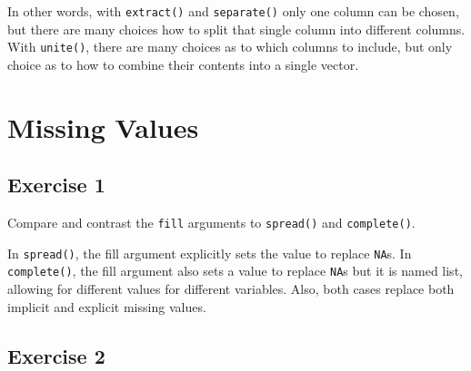 \documentclass[]{book}
\newenvironment{Shaded}{\begin{snugshade}}{\end{snugshade}}
\newcommand{\CommentTok}[1]{\textcolor[rgb]{0.56,0.35,0.01}{\textit{#1}}}
\newcommand{\DataTypeTok}[1]{\textcolor[rgb]{0.13,0.29,0.53}{#1}}
\newcommand{\DecValTok}[1]{\textcolor[rgb]{0.00,0.00,0.81}{#1}}
\newcommand{\KeywordTok}[1]{\textcolor[rgb]{0.13,0.29,0.53}{\textbf{#1}}}
\newcommand{\NormalTok}[1]{#1}
\newcommand{\OperatorTok}[1]{\textcolor[rgb]{0.81,0.36,0.00}{\textbf{#1}}}
\newcommand{\StringTok}[1]{\textcolor[rgb]{0.31,0.60,0.02}{#1}}
\theoremstyle{plain}
\theoremstyle{remark}
\theoremstyle{definition}
\theoremstyle{definition}
\theoremstyle{definition}
\theoremstyle{remark}
\begin{document}
\begin{Shaded}
\end{Shaded}

In other words, with \texttt{extract()} and \texttt{separate()} only one
column can be chosen, but there are many choices how to split that
single column into different columns. With \texttt{unite()}, there are
many choices as to which columns to include, but only choice as to how
to combine their contents into a single vector.

\hypertarget{missing-values-1}{%
\section{Missing Values}\label{missing-values-1}}

\hypertarget{exercise-1-24}{%
\subsection{Exercise 1}\label{exercise-1-24}}

Compare and contrast the \texttt{fill} arguments to \texttt{spread()}
and \texttt{complete()}.

In \texttt{spread()}, the fill argument explicitly sets the value to
replace \texttt{NA}s. In \texttt{complete()}, the fill argument also
sets a value to replace \texttt{NA}s but it is named list, allowing for
different values for different variables. Also, both cases replace both
implicit and explicit missing values.

\hypertarget{exercise-2-23}{%
\subsection{Exercise 2}\label{exercise-2-23}}
\end{document}
